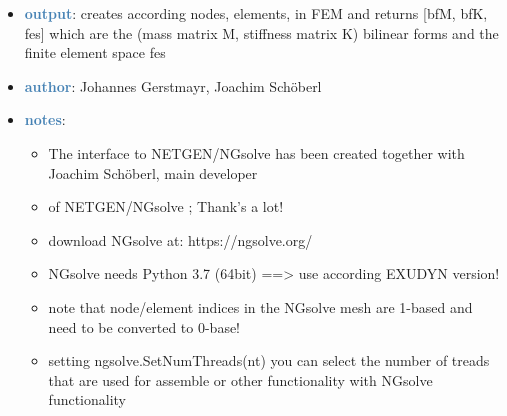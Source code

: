 \begin{itemize}[leftmargin=1.4cm]
\begin{itemize}[leftmargin=1.4cm]
\begin{itemize}[leftmargin=1.4cm]
\begin{itemize}[leftmargin=0.5cm]
\begin{itemize}[leftmargin=1.4cm]
\begin{itemize}[leftmargin=1.4cm]
\begin{itemize}[leftmargin=1.4cm]
\begin{itemize}[leftmargin=0.5cm]
\begin{itemize}[leftmargin=0.7cm]
\begin{itemize}[leftmargin=1.2cm]
\item[]{\it youngsModulus}: In case of single material: Young's modulus used for mechanical model
\item[]{\it poissonsRatio}: In case of single material: Poisson's ratio used for mechanical model
\item[]{\it density}: In case of single material: density used for mechanical model
\item[]{\it materials}: dictionary of material dictionaries according to names in NGsolve mesh, containing youngsModulus, poissonsRatio and density per material, see example
\item[]{\it createBoundaryNodeSets}: if True, during import named boundaries conditions of the mesh are transformed into node sets for further use during mode creation, etc.
\item[]{\it boundaryNamesList}: given as list of boundary names to be used for boundary node sets or None (creating node sets for all boundaries)
\item[]{\it meshOrder}: use 1 for linear elements and 2 for second order elements (recommended to use 2 for much higher accuracy!)
\item[]{\it verbose}: set True to print out some status information
\end{itemize}
\item[--]\textcolor{steelblue}{\bf output}: creates according nodes, elements, in FEM and returns [bfM, bfK, fes] which are the (mass matrix M, stiffness matrix K) bilinear forms and the finite element space fes
\item[--]\textcolor{steelblue}{\bf author}: Johannes Gerstmayr, Joachim Schöberl
\item[--]\textcolor{steelblue}{\bf notes}: \vspace{-6pt}
\begin{itemize}[leftmargin=1.2cm]
\setlength{\itemindent}{-0.7cm}
\item[]The interface to NETGEN/NGsolve has been created together with Joachim Schöberl, main developer
\item[]of NETGEN/NGsolve \cite{Schoeberl1997,NGsolve2014}; Thank's a lot!
\item[]download NGsolve at: https://ngsolve.org/
\item[]NGsolve needs Python 3.7 (64bit) ==> use according EXUDYN version!
\item[]note that node/element indices in the NGsolve mesh are 1-based and need to be converted to 0-base!
\item[]setting ngsolve.SetNumThreads(nt) you can select the number of treads that are used for assemble or other functionality with NGsolve functionality

\end{itemize}
\end{itemize}
\end{itemize}
\end{itemize}
\end{itemize}
\end{itemize}
\end{itemize}
\end{itemize}
\end{itemize}
\end{itemize}
